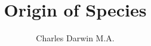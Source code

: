 \documentclass[twocolumn, oneside,12pt]{book}
\begin{document}
\title{Origin of Species}
\author{Charles Darwin M.A.}
\maketitle
\onecolumn
\frontmatter
\dominitoc
\tableofcontents
\twocolumn

\mainmatter









%
%
%
\end{document}
